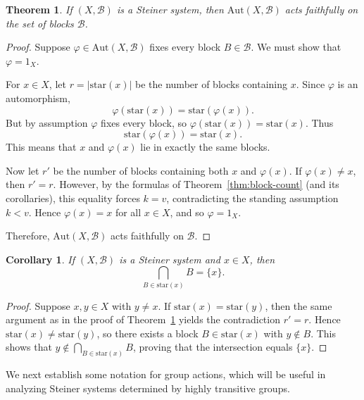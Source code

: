 \documentclass[12pt,a4paper,openany]{book}
\newtheorem{theorem}{Theorem}[section]
\newtheorem{corollary}{Corollary}[section]
\newcommand{\Aut}{\mathrm{Aut}}
\begin{document}
\begin{theorem}\label{thm:faithful-on-blocks}
If $(X, \mathscr{B})$ is a Steiner system, then $\Aut(X, \mathscr{B})$ acts faithfully on the set of blocks $\mathscr{B}$.
\end{theorem}

\begin{proof}
Suppose $\varphi \in \Aut(X, \mathscr{B})$ fixes every block $B \in \mathscr{B}$. We must show that $\varphi = 1_X$.  

For $x \in X$, let $r = |\mathrm{star}(x)|$ be the number of blocks containing $x$. Since $\varphi$ is an automorphism,
\[
\varphi(\mathrm{star}(x)) = \mathrm{star}(\varphi(x)).
\]
But by assumption $\varphi$ fixes every block, so $\varphi(\mathrm{star}(x)) = \mathrm{star}(x)$. Thus
\[
\mathrm{star}(\varphi(x)) = \mathrm{star}(x).
\]
This means that $x$ and $\varphi(x)$ lie in exactly the same blocks.  

Now let $r'$ be the number of blocks containing both $x$ and $\varphi(x)$. If $\varphi(x) \neq x$, then $r' = r$. However, by the formulas of Theorem~\ref{thm:block-count} (and its corollaries), this equality forces $k=v$, contradicting the standing assumption $k < v$. Hence $\varphi(x) = x$ for all $x \in X$, and so $\varphi = 1_X$.  

Therefore, $\Aut(X,\mathscr{B})$ acts faithfully on $\mathscr{B}$.
\end{proof}

\begin{corollary}\label{cor:star-intersection}
If $(X, \mathscr{B})$ is a Steiner system and $x \in X$, then
\[
\bigcap_{B \in \mathrm{star}(x)} B = \{x\}.
\]
\end{corollary}

\begin{proof}
Suppose $x, y \in X$ with $y \neq x$. If $\mathrm{star}(x) = \mathrm{star}(y)$, then the same argument as in the proof of Theorem~\ref{thm:faithful-on-blocks} yields the contradiction $r' = r$. Hence $\mathrm{star}(x) \neq \mathrm{star}(y)$, so there exists a block $B \in \mathrm{star}(x)$ with $y \notin B$. This shows that $y \notin \bigcap_{B \in \mathrm{star}(x)} B$, proving that the intersection equals $\{x\}$.
\end{proof}

\medskip

We next establish some notation for group actions, which will be useful in analyzing Steiner systems determined by highly transitive groups.  
\end{document}
